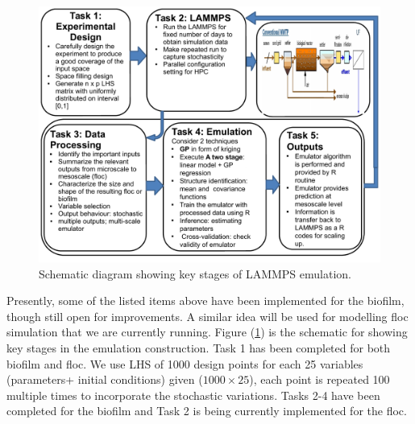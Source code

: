 \documentclass[12pt,titlepage]{report}
\theoremstyle{definition}
\theoremstyle{remark}
\begin{document}
\begin{figure}[!ht] 
\includegraphics[width=1.1\textwidth]{diagram1}
\caption[]{Schematic diagram showing key stages of LAMMPS emulation.}\label{diag1}
\end{figure}

Presently, some of the listed items above have been implemented for the biofilm, though still open for improvements. A similar idea will be used for modelling floc simulation that we are currently running. Figure (\ref{diag1}) is the schematic for showing key stages in the emulation construction. Task 1 has been completed for both biofilm and floc. We use LHS of 1000 design points for each 25 variables (parameters+ initial conditions) given ($1000 \times 25$), each point is repeated 100 multiple times to incorporate the stochastic variations.
Tasks 2-4 have been completed for the biofilm and Task 2 is being currently implemented for the floc. %
\end{document}
